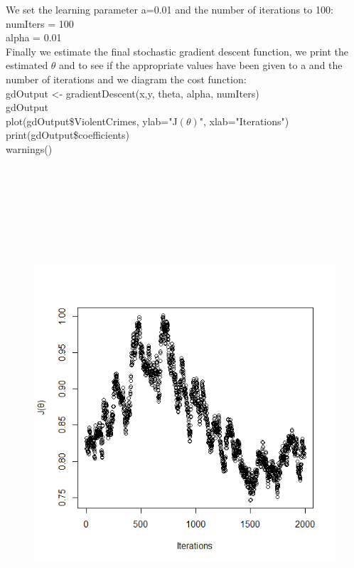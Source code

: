 \documentclass[10pt,a4paper]{article}
\begin{document}
	We set the learning parameter a=0.01 and the number of iterations to 100:\\
	numIters = 100\\
	alpha  = 0.01\\
	
	Finally we estimate the final stochastic gradient descent function, we print the estimated $\theta$ and to see if the appropriate values have been given to a and the number of iterations and we diagram the cost function:\\
	gdOutput <- gradientDescent(x,y, theta, alpha, numIters)\\
	gdOutput\\
	plot(gdOutput\$ViolentCrimes, ylab="J$(\theta)$", xlab="Iterations")\\
	print(gdOutput\$coefficients)\\
	warnings()\\
	\\
	\\
	\\
	\\
	\\
	\\
	\\
	
	\begin{figure}
		\includegraphics[scale=0.7]{Rplot}
		\centering
	\end{figure}
	
\end{document}
